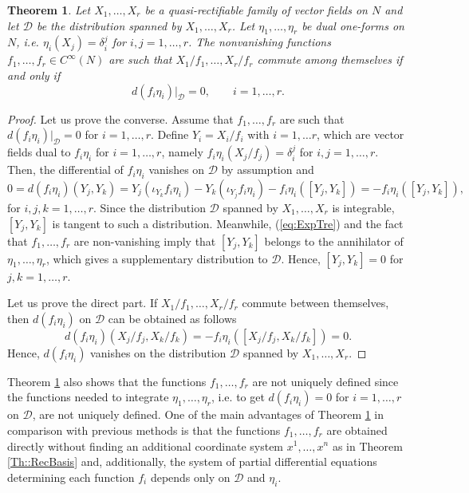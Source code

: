 \documentclass[12pt]{article}
\theoremstyle{plain}
\newtheorem{theorem}{Theorem}[section]
\theoremstyle{definition}
\numberwithin{equation}{section}
\begin{document}
\begin{theorem}\label{Th:FroRecBett} Let $X_1,\ldots ,X_r$ be a quasi-rectifiable family of vector fields on $N$ and let $\mathcal{D}$ be the
distribution spanned by $X_1,\ldots,X_r$. Let $\eta_1,\ldots,\eta_r$ be  dual one-forms on $N$, i.e. $\eta_i(X_j)=\delta_i^j$ for $i,j=1,\ldots,r$. The nonvanishing functions $f_1,\ldots,f_r\in C^\infty(N)$ are such that  $X_1/f_1,\ldots,X_r/f_r$ commute among themselves if and only if 
\begin{equation}\label{Eq:MethodSol}
d(f_i\eta_i)|_\mathcal{D}=0,\qquad i=1,\ldots,r.
\end{equation}

\end{theorem}
\begin{proof} Let us prove the converse. Assume that $f_1,\ldots,f_r$ are such that $d(f_i
\eta_i)|_{\mathcal{D}}=0$ for $i=1,\ldots,r$. Define $Y_i={X_i}/{f_i}$ with $i=1,\ldots r$, which are vector fields dual to $f_i\eta_i$ for $i=1,\ldots,r$, namely $f_i\eta_i(X_j/f_j)=\delta_i^j$ for $i,j=1,\ldots,r$. Then, the differential of $f_i\eta_i$ vanishes on $\mathcal{D}$ by assumption and
\begin{equation}\label{eq:ExpTre}
0=d(f_i\eta_i)(Y_j,Y_k)=Y_j(\iota_{Y_k}f_i\eta_i)-Y_k(\iota_{Y_j}f_i\eta_i)-f_i\eta_i([Y_j,Y_k])=-f_i\eta_i([Y_j,Y_k]),
\end{equation}
for  $i,j,k=1,\ldots,r.$ Since the distribution $\mathcal{D}$ spanned by $X_1,\ldots,X_r$ is integrable,  $[Y_j,Y_k]$ is tangent to such a distribution. Meanwhile, (\ref{eq:ExpTre}) and the fact that $f_1,\ldots,f_r$ are non-vanishing imply that $[Y_j,Y_k]$ belongs to the annihilator of $\eta_1,\ldots,\eta_r$, which gives a supplementary distribution to $\mathcal{D}$. Hence, $[Y_j,Y_k]=0$ for $j,k=1,\ldots,r$.  

Let us prove the direct part. If $X_1/f_1,\ldots,X_r/f_r$ commute between themselves, then $d(f_i\eta_i)$ on $\mathcal{D}$ can be obtained as follows
$$
d(f_i\eta_i)(X_j/f_j,X_k/f_k)=-f_i\eta_i([X_j/f_j,X_k/f_k])=0.
$$
Hence, $d(f_i\eta_i)$ vanishes on the distribution $\mathcal{D}$ spanned by $X_1,\ldots,X_r$.
\end{proof}
Theorem \ref{Th:FroRecBett} also shows that the functions $f_1,\ldots,f_r$ are not uniquely defined since the functions needed to integrate $\eta_1,\ldots,\eta_r$, i.e. to get $d(f_i\eta_i)=0$ for $i=1,\ldots,r$ on $\mathcal{D}$, are not uniquely defined. One of the main advantages of Theorem \ref{Th:FroRecBett} in comparison with previous methods is that the functions $f_1,\ldots,f_r$ are obtained directly without finding an additional coordinate system $x^1,\ldots,x^n$ as in Theorem \ref{Th::RecBasis} and, additionally, the system of partial differential equations determining each function $f_i$ depends only on $\mathcal{D}$ and $\eta_i$.
\end{document}
